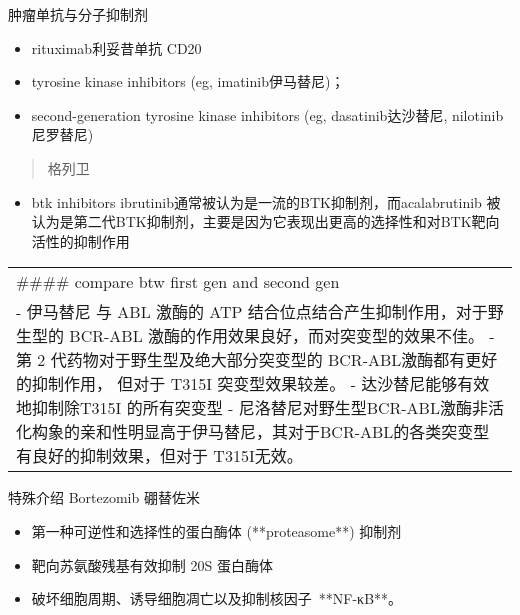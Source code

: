 \documentclass[
  ignorenonframetext,
]{beamer}
\providecommand{\tightlist}{%
  \setlength{\itemsep}{0pt}\setlength{\parskip}{0pt}}
\begin{document}
\begin{frame}
\begin{block}{肿瘤单抗与分子抑制剂}
\protect\hypertarget{ux80bfux7624ux5355ux6297ux4e0eux5206ux5b50ux6291ux5236ux5242}{}
\begin{itemize}
\item
  rituximab利妥昔单抗 CD20
\item
  tyrosine kinase inhibitors (eg, imatinib伊马替尼)；
\item
  second-generation tyrosine kinase inhibitors (eg, dasatinib达沙替尼,
  nilotinib尼罗替尼)
\end{itemize}

\begin{quote}
格列卫
\end{quote}

\begin{itemize}
\tightlist
\item
  btk inhibitors ibrutinib通常被认为是一流的BTK抑制剂，而acalabrutinib
  被认为是第二代BTK抑制剂，主要是因为它表现出更高的选择性和对BTK靶向活性的抑制作用
\end{itemize}

\begin{longtable}[]{@{}
  >{\raggedright\arraybackslash}p{}@{}}
\toprule()
\endhead
\#\#\#\# compare btw first gen and second gen \\
- 伊马替尼 与 ABL 激酶的 ATP 结合位点结合产生抑制作用，对于野生型的
BCR-ABL 激酶的作用效果良好，而对突变型的效果不佳。 - 第 2
代药物对于野生型及绝大部分突变型的 BCR-ABL激酶都有更好的抑制作用，
但对于 T315I 突变型效果较差。 - 达沙替尼能够有效地抑制除T315I
的所有突变型 -
尼洛替尼对野生型BCR-ABL激酶非活化构象的亲和性明显高于伊马替尼，其对于BCR-ABL的各类突变型有良好的抑制效果，但对于
T315I无效。 \\
\bottomrule()
\end{longtable}
\end{block}

\begin{block}{特殊介绍 Bortezomib 硼替佐米}
\protect\hypertarget{ux7279ux6b8aux4ecbux7ecd-bortezomib-ux787cux66ffux4f50ux7c73}{}
\begin{itemize}
\item
  第一种可逆性和选择性的蛋白酶体 (**proteasome**) 抑制剂
\item
  靶向苏氨酸残基有效抑制 20S 蛋白酶体
\item
  破坏细胞周期、诱导细胞凋亡以及抑制核因子~**NF-κB**。
\end{itemize}
\end{block}
\end{frame}
\end{document}

